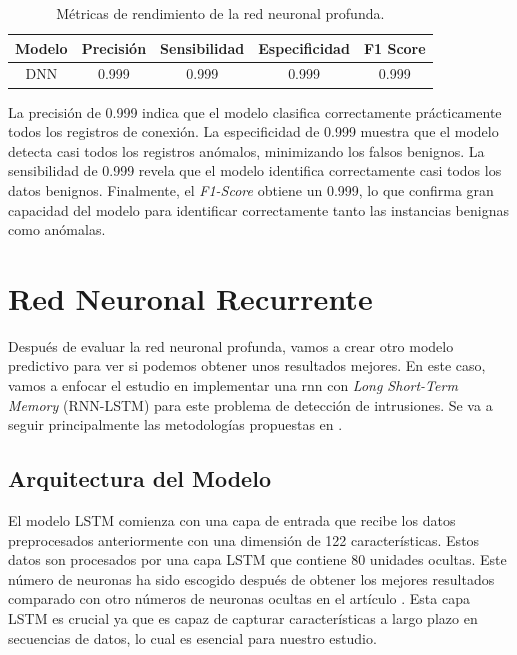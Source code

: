 \begin{table}[H]
\centering
\begin{tabular}{|c|c|c|c|c|}
\hline
Modelo & Precisión & Sensibilidad & Especificidad & F1 Score \\ \hline
DNN & 0.999 & 0.999 & 0.999 & 0.999 \\ \hline
\end{tabular}
\caption{Métricas de rendimiento de la red neuronal profunda.}
\label{tab:kddDNN}
\end{table}

La precisión de 0.999 indica que el modelo clasifica correctamente prácticamente todos los registros de conexión. La especificidad de 0.999 muestra que el modelo detecta casi todos los registros anómalos, minimizando los falsos benignos. La sensibilidad de 0.999 revela que el modelo identifica correctamente casi todos los datos benignos. Finalmente, el \textit{F1-Score} obtiene un 0.999, lo que confirma gran capacidad del modelo para identificar correctamente tanto las instancias benignas como anómalas.










\section{Red Neuronal Recurrente}

Después de evaluar la red neuronal profunda, vamos a crear otro modelo predictivo para ver si podemos obtener unos resultados mejores. En este caso, vamos a enfocar el estudio en implementar una \acrfull{rnn} con \textit{Long Short-Term Memory} (RNN-LSTM) para este problema de detección de intrusiones. Se va a seguir principalmente las metodologías propuestas en \citep{yin2017deep,kim2016long}.

\subsection{Arquitectura del Modelo}

El modelo LSTM comienza con una capa de entrada que recibe los datos preprocesados anteriormente con una dimensión de 122 características. Estos datos son procesados por una capa LSTM que contiene 80 unidades ocultas. Este número de neuronas ha sido escogido después de obtener los mejores resultados comparado con otro números de neuronas ocultas en el artículo \citep{yin2017deep}. Esta capa LSTM es crucial ya que es capaz de capturar características a largo plazo en secuencias de datos, lo cual es esencial para nuestro estudio.

